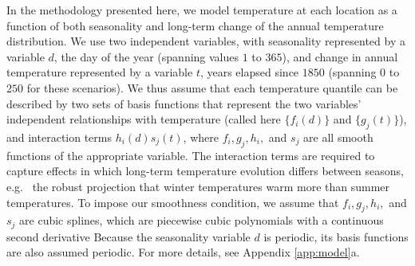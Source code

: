 \documentclass{ametsoc}
\begin{document}
In the methodology presented here, we model temperature at each location as a function of both seasonality and long-term change of the annual temperature distribution. %
We use two independent variables, with seasonality represented by a variable $d$, the day of the year (spanning values $1$ to $365$), and change in annual temperature represented by a variable $t$, years elapsed since $1850$ (spanning $0$ to $250$ for these scenarios).
We thus assume that each temperature quantile can be described by two sets of basis functions that represent the two variables' independent relationships with temperature (called here $\{f_i(d)\}$ and $\{g_j(t)\}$), and interaction terms $h_i(d)s_j(t)$, where 
$f_i, g_j, h_i,$ and $s_j$ are all smooth functions of the appropriate variable. %
The interaction terms are required to capture effects in which long-term temperature evolution differs between seasons, e.g.\
the robust projection that winter temperatures warm more than summer temperatures. 
To impose our smoothness condition, we assume that $f_i, g_j, h_i,$ and $s_j$ are cubic splines, which are piecewise cubic polynomials with a continuous second derivative \citep[For a review of cubic polynomial basis functions, see][Chapter 5.]{ESL}
Because the seasonality variable $d$ is periodic, its basis functions are also assumed periodic. 
For more details, see Appendix \ref{app:model}a.
\end{document}
